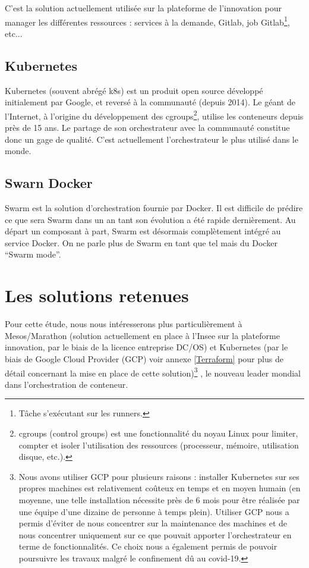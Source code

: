 \documentclass[11pt,fleqn]{book} %
\begin{document}
C'est la solution actuellement utilisée sur la plateforme de l'innovation pour manager les différentes ressources : services à la demande, Gitlab, job Gitlab\footnote{Tâche s'exécutant sur les runners.}, etc... \\ 

\subsection{Kubernetes}
Kubernetes (souvent abrégé k8s) est un produit open source développé initialement par Google, et reversé à la communauté (depuis 2014). Le géant de l’Internet, à l’origine du développement des cgroups\footnote{cgroups (control groups) est une fonctionnalité du noyau Linux pour limiter, compter et isoler l'utilisation des ressources (processeur, mémoire, utilisation disque, etc.).}, utilise les conteneurs depuis près de 15 ans. Le partage de son orchestrateur avec la communauté constitue donc un gage de qualité. C'est actuellement l'orchestrateur le plus utilisé dans le monde.

\subsection{Swarn Docker}
Swarm est la solution d’orchestration fournie par Docker. Il est difficile de prédire ce que sera Swarm dans un an tant son évolution a été rapide dernièrement. Au départ un composant à part, Swarm est désormais complètement intégré au service Docker. On ne parle plus de Swarm en tant que tel mais du Docker “Swarm mode”.\\

\section{Les solutions retenues}
Pour cette étude, nous nous intéresserons plus particulièrement à Mesos/Marathon (solution actuellement en place à l'Insee sur la plateforme innovation, par le biais de la licence entreprise DC/OS) et Kubernetes (par le biais de Google Cloud Provider (GCP) voir annexe \ref{Terraform} pour plus de détail concernant la mise en place de cette solution)\footnote{Nous avons utiliser GCP pour plusieurs raisons : installer Kubernetes sur ses propres machines est relativement coûteux en temps et en moyen humain (en moyenne, une telle installation nécessite près de 6 mois pour être réalisée par une équipe d'une dizaine de personne à temps plein). Utiliser GCP nous a permis d'éviter de nous concentrer sur la maintenance des machines et de nous concentrer uniquement sur ce que pouvait apporter l'orchestrateur en terme de fonctionnalités. Ce choix nous a également permis de pouvoir poursuivre les travaux malgré le confinement dû au covid-19.} , le nouveau leader mondial dans l'orchestration de conteneur.\newline
\end{document}
